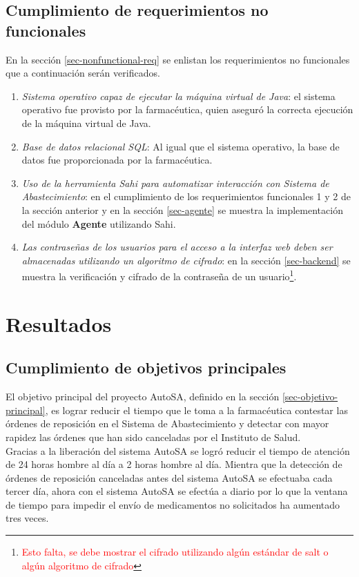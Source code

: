 \subsection{Cumplimiento de requerimientos no funcionales}
En la sección \ref{sec-nonfunctional-req} se enlistan los requerimientos no funcionales que a continuación serán verificados.
\begin{enumerate}
	\item \textit{Sistema operativo capaz de ejecutar la máquina virtual de Java}: el sistema operativo fue provisto por la farmacéutica, quien aseguró la correcta ejecución de la máquina virtual de Java.
	\item \textit{Base de datos relacional SQL}: Al igual que el sistema operativo, la base de datos fue proporcionada por la farmacéutica.
	\item \textit{Uso de la herramienta Sahi para automatizar interacción con Sistema de Abastecimiento}: en el cumplimiento de los requerimientos funcionales 1 y 2 de la sección anterior y en la sección \ref{sec-agente} se muestra la implementación del módulo \textbf{Agente} utilizando Sahi.
	\item \textit{Las contraseñas de los usuarios para el acceso a la interfaz web deben ser almacenadas utilizando un algoritmo de cifrado}: en la sección \ref{sec-backend} se muestra la verificación y cifrado de la contraseña de un usuario\footnote{\textcolor{red}{Esto falta, se debe mostrar el cifrado utilizando algún estándar de salt o algún algoritmo de cifrado}}.
\end{enumerate}

\section{Resultados}

\subsection{Cumplimiento de objetivos principales}
El objetivo principal del proyecto AutoSA, definido en la sección \ref{sec-objetivo-principal}, es lograr reducir el tiempo que le toma a la farmacéutica contestar las órdenes de reposición en el Sistema de Abastecimiento y detectar con mayor rapidez las órdenes que han sido canceladas por el Instituto de Salud.\\
Gracias a la liberación del sistema AutoSA se logró reducir el tiempo de atención de 24 horas hombre al día a 2 horas hombre al día. Mientra que la detección de órdenes de reposición canceladas antes del sistema AutoSA se efectuaba cada tercer día, ahora con el sistema AutoSA se efectúa a diario por lo que la ventana de tiempo para impedir el envío de medicamentos no solicitados ha aumentado tres veces.

